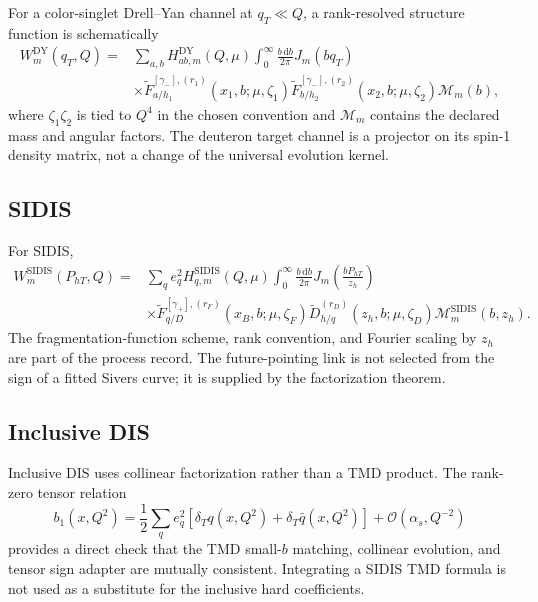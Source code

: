 \documentclass[11pt]{article}
\newcommand{\dd}{\mathrm{d}}
\newcommand{\cO}{\mathcal O}
\newcommand{\cM}{\mathcal M}
\newcommand{\DY}{\mathrm{DY}}
\newcommand{\SIDIS}{\mathrm{SIDIS}}
\begin{document}
For a color-singlet Drell--Yan channel at \(q_T\ll Q\), a rank-resolved
structure function is schematically
\begin{align}
 W_m^{\DY}(q_T,Q)
 ={}&
 \sum_{a,b}
 H_{ab,m}^{\DY}(Q,\mu)
 \int_0^\infty\frac{b\,\dd b}{2\pi}
 J_m(bq_T)
 \nonumber\\
 &\times
 \widetilde F_{a/h_1}^{[\gamma_-],(r_1)}
 (x_1,b;\mu,\zeta_1)
 \widetilde F_{b/h_2}^{[\gamma_-],(r_2)}
 (x_2,b;\mu,\zeta_2)
 \cM_m(b),
 \label{eq:dy-w-term}
\end{align}
where \(\zeta_1\zeta_2\) is tied to \(Q^4\) in the chosen convention and
\(\cM_m\) contains the declared mass and angular factors.  The deuteron target
channel is a projector on its spin-1 density matrix, not a change of the
universal evolution kernel.

\subsection{SIDIS}

For SIDIS,
\begin{align}
 W_m^{\SIDIS}(P_{hT},Q)
 ={}&
 \sum_q e_q^2 H_{q,m}^{\SIDIS}(Q,\mu)
 \int_0^\infty\frac{b\,\dd b}{2\pi}
 J_m\!\left(\frac{bP_{hT}}{z_h}\right)
 \nonumber\\
 &\times
 \widetilde F_{q/D}^{[\gamma_+],(r_F)}
 (x_B,b;\mu,\zeta_F)
 \widetilde D_{h/q}^{(r_D)}
 (z_h,b;\mu,\zeta_D)
 \cM_m^{\SIDIS}(b,z_h).
 \label{eq:sidis-w-term}
\end{align}
The fragmentation-function scheme, rank convention, and Fourier scaling by
\(z_h\) are part of the process record.  The future-pointing link is not
selected from the sign of a fitted Sivers curve; it is supplied by the
factorization theorem.

\subsection{Inclusive DIS}

Inclusive DIS uses collinear factorization rather than a TMD product.  The
rank-zero tensor relation
\begin{equation}
 b_1(x,Q^2)
 =\frac12\sum_q e_q^2
 \left[
 \delta_T q(x,Q^2)+\delta_T\bar q(x,Q^2)
 \right]
 +\cO(\alpha_s,Q^{-2})
 \label{eq:b1-evolved-relation}
\end{equation}
provides a direct check that the TMD small-\(b\) matching, collinear evolution,
and tensor sign adapter are mutually consistent.  Integrating a SIDIS TMD
formula is not used as a substitute for the inclusive hard coefficients.
\end{document}
